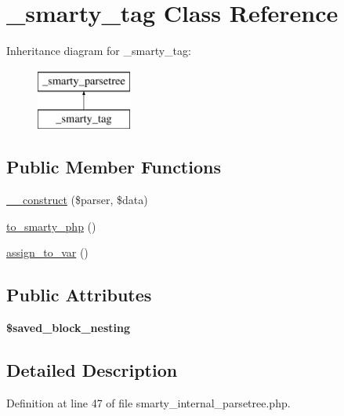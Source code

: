 \hypertarget{class__smarty__tag}{\section{\-\_\-smarty\-\_\-tag Class Reference}
\label{class__smarty__tag}
}
Inheritance diagram for \-\_\-smarty\-\_\-tag\-:\begin{figure}[H]
\begin{center}
\leavevmode
\includegraphics[height=2.000000cm]{class__smarty__tag}
\end{center}
\end{figure}
\subsection*{Public Member Functions}
\begin{DoxyCompactItemize}
\item 
\hyperlink{class__smarty__tag_a0856e783ab0634dc2e76caf0a12af46a}{\-\_\-\-\_\-construct} (\$parser, \$data)
\item 
\hyperlink{class__smarty__tag_afb0cfe4f8c8b586aa60d1da409798a59}{to\-\_\-smarty\-\_\-php} ()
\item 
\hyperlink{class__smarty__tag_a26efd9ba00a4c6d16cb5c9ca30c10283}{assign\-\_\-to\-\_\-var} ()
\end{DoxyCompactItemize}
\subsection*{Public Attributes}
\begin{DoxyCompactItemize}
\item 
\hypertarget{class__smarty__tag_a6933bf94304fc76f27d6e09b5d122ec4}{{\bfseries \$saved\-\_\-block\-\_\-nesting}}\label{class__smarty__tag_a6933bf94304fc76f27d6e09b5d122ec4}

\end{DoxyCompactItemize}


\subsection{Detailed Description}


Definition at line 47 of file smarty\-\_\-internal\-\_\-parsetree.\-php.




